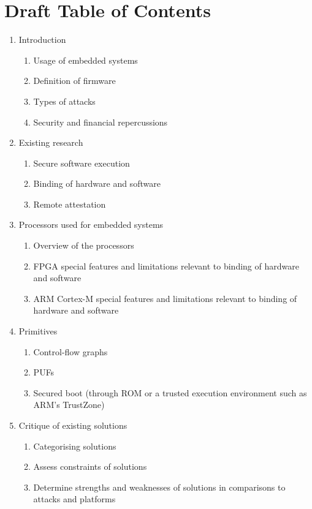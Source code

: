 \documentclass[10pt]{report}
\begin{document}
\chapter*{Draft Table of Contents}
\begin{enumerate}
	\item Introduction
		\begin{enumerate}
			\item Usage of embedded systems	
			\item Definition of firmware		
			\item Types of attacks
			\item Security and financial repercussions 
		\end{enumerate}
	\item Existing research
		\begin{enumerate}
			\item Secure software execution
			\item Binding of hardware and software
			\item Remote attestation
		\end{enumerate}
	\item Processors used for embedded systems
		\begin{enumerate}
			\item Overview of the processors
			\item FPGA special features and limitations relevant to binding of hardware and software
			\item ARM Cortex-M special features and limitations relevant to binding of hardware and software
		\end{enumerate}
	\item Primitives
		\begin{enumerate}
			\item Control-flow graphs
			\item PUFs
			\item Secured boot (through ROM or a trusted execution environment such as ARM's TrustZone)			
		\end{enumerate}
	\item Critique of existing solutions
		\begin{enumerate}
			\item Categorising solutions
			\item Assess constraints of solutions
			\item Determine strengths and weaknesses of solutions in comparisons to attacks and platforms 
		\end{enumerate}

\end{enumerate}
\end{document}

